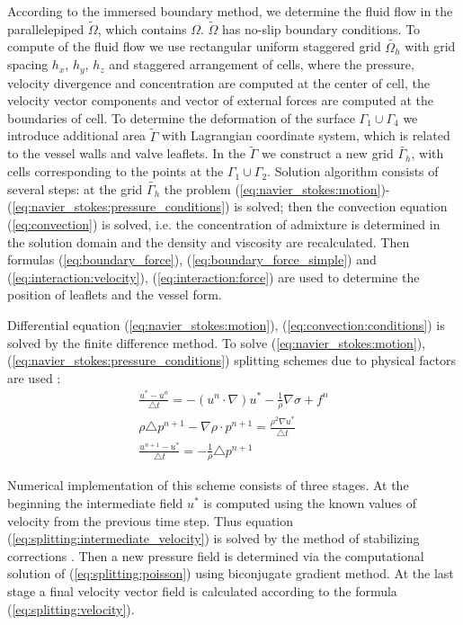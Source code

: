 \documentclass[runningheads,a4paper]{llncs}
\begin{document}
According to the immersed boundary method, we determine the fluid flow in the parallelepiped $\tilde{\Omega}$, which contains $\Omega$.
$\tilde{\Omega}$ has no-slip boundary conditions.
To compute of the fluid flow we use rectangular uniform staggered grid $\tilde{\Omega_h}$ with grid spacing $h_x$, $h_y$, $h_z$ and 
staggered arrangement of cells, where the pressure, velocity divergence and concentration are computed at the center of cell, the velocity vector components
and vector of external forces are computed at the boundaries of cell. To determine the deformation of the surface
$\Gamma_1 \cup \Gamma_4$ we introduce additional area $\tilde{\Gamma}$ with Lagrangian coordinate system, which is related to the vessel
walls and valve leaflets. In the $\tilde{\Gamma}$ we construct a new grid $\tilde{\Gamma_h}$, with cells corresponding to the points at the $\Gamma_1 \cup \Gamma_2$.
Solution algorithm consists of several steps:
at the grid $\tilde{\Gamma_h}$ the problem (\ref{eq:navier_stokes:motion})-(\ref{eq:navier_stokes:pressure_conditions}) is solved; then the convection equation 
(\ref{eq:convection}) is solved, i.e. the concentration of admixture is determined in the solution domain and the density and viscosity are recalculated.
Then formulas (\ref{eq:boundary_force}), (\ref{eq:boundary_force_simple}) and (\ref{eq:interaction:velocity}), (\ref{eq:interaction:force}) are used to
determine the position of leaflets and the vessel form.

Differential equation (\ref{eq:navier_stokes:motion}), (\ref{eq:convection:conditions}) is solved by the finite difference method.
To solve (\ref{eq:navier_stokes:motion}), (\ref{eq:navier_stokes:pressure_conditions}) splitting schemes due to physical factors are used \cite{belotserkovsky}:
\begin{gather}
    \label{eq:splitting:intermediate_velocity}
    \frac{u^* - u^n}{\triangle t} = - (u^n \cdot \nabla) u^* - \frac{1}{\rho} \nabla \sigma + f^n\\
    \label{eq:splitting:poisson}
    \rho \triangle p^{n+1} - \nabla \rho \cdot p^{n+1} = \frac{\rho^2 \nabla u^*}{\triangle t}\\
    \label{eq:splitting:velocity}
    \frac{u^{n+1} - u^*}{\triangle t} = - \frac{1}{\rho} \triangle p^{n+1}
\end{gather}

Numerical implementation of this scheme consists of three stages. At the beginning the intermediate field $u^*$  is computed using the known values of velocity
from the previous time step. Thus equation (\ref{eq:splitting:intermediate_velocity}) is solved by the method of stabilizing corrections \cite{yanenko}.
Then a new pressure field is determined via the computational solution of (\ref{eq:splitting:poisson}) using biconjugate gradient method.
At the last stage a final velocity vector field is calculated according to the formula (\ref{eq:splitting:velocity}).
\end{document}
